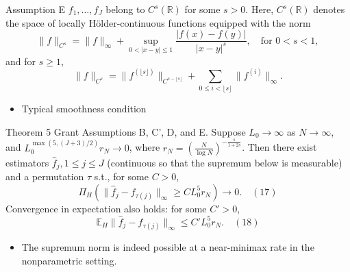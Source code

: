 \documentclass[10pt, aspectratio=169]{beamer}
\begin{document}
\begin{frame}
   \begin{assumpbox}{Assumption E}
        \( f_1, \ldots, f_J \) belong to \( C^s(\mathbb{R}) \) for some \( s > 0 \). Here, \( C^s(\mathbb{R}) \) denotes the space of locally Hölder-continuous functions equipped with the norm
        \[
        \| f \|_{C^s} = \| f \|_\infty + \sup_{0 < |x - y| \leq 1} \frac{|f(x) - f(y)|}{|x - y|^s}, \quad \text{for } 0 < s < 1,
        \]
        and for \( s \geq 1 \),
        \[
        \| f \|_{C^s} = \| f^{(\lfloor s \rfloor)} \|_{C^{s - \lfloor s \rfloor}} + \sum_{0 \leq i < \lfloor s \rfloor} \| f^{(i)} \|_\infty.
        \]
    \end{assumpbox}
    \begin{itemize}[label=\scalebox{0.5}{$\blacksquare$}]
    \item Typical smoothness condition
    
    \end{itemize}
\end{frame}
   \begin{frame}
    \begin{mytheorembox}{Theorem 5}
        Grant Assumptions B, C', D, and E. Suppose \( L_0 \to \infty \) as \( N \to \infty \), and \( L_0^{\max(5, (J+3)/2)} r_N \to 0 \), where \( r_N = \left( \frac{N}{\log N} \right)^{-\frac{s}{1 + 2s}} \). Then there exist estimators \( \hat{f}_j, 1 \leq j \leq J \) (continuous so that the supremum below is measurable) and a permutation \( \tau \) s.t., for some \( C > 0 \),
        \[
        \Pi_H \left( \| \hat{f}_j - f_{\tau(j)} \|_\infty \geq C L_0^5 r_N \right) \to 0.     \quad     (17)
        \]
        Convergence in expectation also holds: for some \( C' > 0 \),
        \[
        \mathbb{E}_H \| \hat{f}_j - f_{\tau(j)} \|_\infty \leq C' L_0^5 r_N.     \quad     (18)
        \]
    \end{mytheorembox}
    \begin{itemize}[label=\scalebox{0.5}{$\blacksquare$}]
    \item The supremum norm is indeed possible at a near-minimax rate in the nonparametric setting.
    \end{itemize}
\end{frame}
\end{document}
